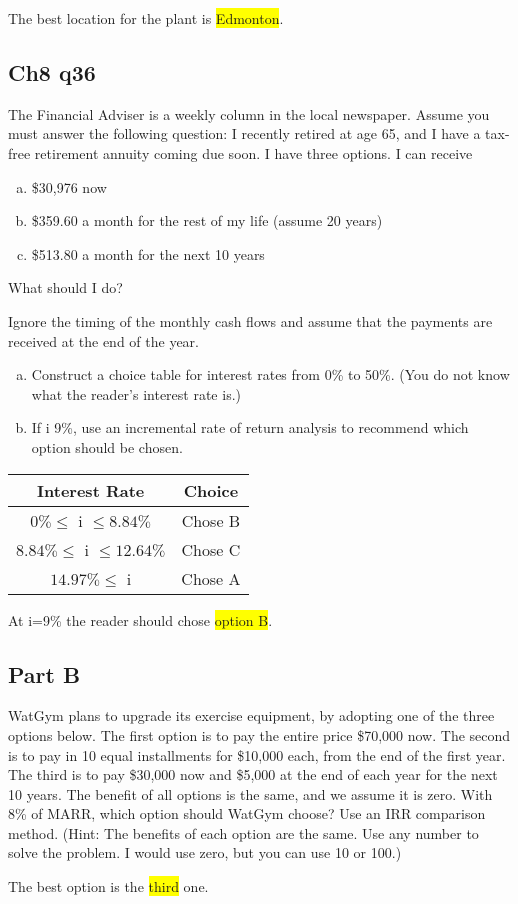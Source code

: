 \documentclass[12pt]{article}
\newcommand{\hilight}[1]{\colorbox{yellow}{#1}}
\begin{document}
The best location for the plant is \hilight{Edmonton}.

\subsection*{Ch8 q36}
The Financial Adviser is a weekly column in the local newspaper. Assume you must answer the following question: I recently retired at age 65, and I have a tax-free retirement annuity coming due soon. I have three options. I can receive
\begin{enumerate}[(a)]
    \item \$30,976 now
    \item \$359.60 a month for the rest of my life (assume 20 years)
    \item \$513.80 a month for the next 10 years
\end{enumerate}
What should I do?

Ignore the timing of the monthly cash flows and assume that the payments are received at the end of the year.
\begin{enumerate}[(a)]
    \item Construct a choice table for interest rates from 0\% to 50\%. (You do not know what the reader's interest rate is.)
    \item If i 9\%, use an incremental rate of return analysis to recommend which option should be chosen.
\end{enumerate}

\begin{center}
    \begin{tabular}{c c }
        \textbf{Interest Rate} & \textbf{Choice}\\
        \hline
        $0\%\leq$ i $\leq 8.84\%$ & Chose B\\
        $8.84\%\leq$ i $\leq 12.64\%$ & Chose C\\
        $14.97\%\leq$ i & Chose A\\
        \hline
    \end{tabular}
\end{center}

At i=9\% the reader should chose \hilight{option B}.

\subsection*{Part B}
WatGym plans to upgrade its exercise equipment, by adopting one of the three options below. The first option is to pay the entire price \$70,000 now. The second is to pay in 10 equal installments for \$10,000 each, from the end of the first year. The third is to pay \$30,000 now and \$5,000 at the end of each year for the next 10 years. The benefit of all options is the same, and we assume it is
zero. With 8\% of MARR, which option should WatGym choose? Use an IRR comparison method. (Hint: The benefits of each option are the same. Use any number to solve the problem. I would use zero, but you can use 10 or 100.)

The best option is the \hilight{third} one.
\end{document}
